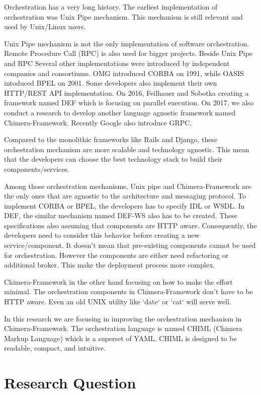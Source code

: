\documentclass[conference]{IEEEtran}
\begin{document}
Orchestration has a very long history. The earliest implementation of orchestration was Unix Pipe mechanism. This mechanism is still relevant and used by Unix/Linux users.

Unix Pipe mechanism is not the only implementation of software orchestration. Remote Procedure Call (RPC) is also used for bigger projects. Beside Unix Pipe and RPC Several other implementations were introduced by independent companies and consortiums. OMG introduced CORBA on 1991, while OASIS intoduced BPEL on 2001. Some developers also implement their own HTTP/REST API implementation. On 2016, Feilhauer and Sobotka creating a framework named DEF which is focusing on parallel execution. On 2017, we also conduct a research to develop another language agnostic framework named Chimera-Framework. Recently Google also introduce GRPC.

Compared to the monolithic frameworks like Rails and Django, these orchestration mechanism are more scalable and technology agnostic. This mean that the developers can choose the best technology stack to build their components/services.

Among those orchestration mechanisms, Unix pipe and Chimera-Framework are the only ones that are agnostic to the architecture and messaging protocol. To implement CORBA or BPEL, the developers has to specify IDL or WSDL. In DEF, the similar mechanism named DEF-WS also has to be created. These specifications also assuming that components are HTTP aware. Consequently, the developers need to consider this behavior before creating a new service/component. It doesn't mean that pre-existing components cannot be used for orchestration. However the components are either need refactoring or additional broker. This make the deployment process more complex.

Chimera-Framework in the other hand focusing on how to make the effort minimal. The orchestration components in Chimera-Framework don't have to be HTTP aware. Even an old UNIX utility like `date` or `cat` will serve well.

In this research we are focusing in improving the orchestration mechanism in Chimera-Framework. The orchestration language is named CHIML (Chimera Markup Language) which is a superset of YAML. CHIML is designed to be readable, compact, and intuitive.


\section{Research Question}
\end{document}
